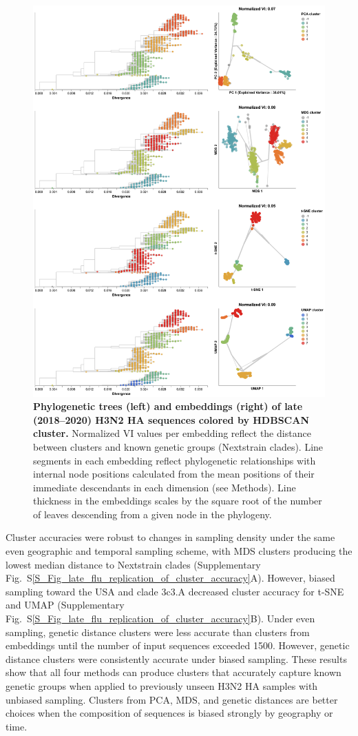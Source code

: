 \documentclass[webpdf,contemporary,large,single]{oup-authoring-template}%
\theoremstyle{thmstyleone}%
\theoremstyle{thmstyletwo}%
\theoremstyle{thmstylethree}%
\begin{document}
\begin{figure}[!h]
\includegraphics[width=0.9\columnwidth]{figures/flu-2018-2020-ha-embeddings-by-cluster.png}
\caption{{\bf Phylogenetic trees (left) and embeddings (right) of late (2018--2020) H3N2 HA sequences colored by HDBSCAN cluster.}
  Normalized VI values per embedding reflect the distance between clusters and known genetic groups (Nextstrain clades).
  Line segments in each embedding reflect phylogenetic relationships with internal node positions calculated from the mean positions of their immediate descendants in each dimension (see Methods).
  Line thickness in the embeddings scales by the square root of the number of leaves descending from a given node in the phylogeny.}
\label{fig:seasonal-influenza-h3n2-ha-2018-2020-clusters}
\end{figure}

Cluster accuracies were robust to changes in sampling density under the same even geographic and temporal sampling scheme, with MDS clusters producing the lowest median distance to Nextstrain clades (Supplementary Fig.~S\ref{S_Fig_late_flu_replication_of_cluster_accuracy}A).
However, biased sampling toward the USA and clade 3c3.A decreased cluster accuracy for t-SNE and UMAP (Supplementary Fig.~S\ref{S_Fig_late_flu_replication_of_cluster_accuracy}B).
Under even sampling, genetic distance clusters were less accurate than clusters from embeddings until the number of input sequences exceeded 1500.
However, genetic distance clusters were consistently accurate under biased sampling.
These results show that all four methods can produce clusters that accurately capture known genetic groups when applied to previously unseen H3N2 HA samples with unbiased sampling.
Clusters from PCA, MDS, and genetic distances are better choices when the composition of sequences is biased strongly by geography or time.
\end{document}
